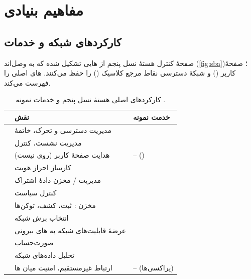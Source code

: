 \documentclass[11pt,a4paper]{article}
\begin{document}
\section{مفاهیم بنیادی}

\subsection{کارکردهای شبکه و خدمات}
صفحهٔ کنترل هستهٔ نسل پنجم از هایی تشکیل شده که به  وصل‌اند (\cref{fig:sba})؛ صفحهٔ کاربر () و
شبکهٔ دسترسی نقاط مرجع کلاسیک () را حفظ می‌کنند.  های اصلی را فهرست می‌کند.

\begin{table}[htbp]
\centering\small
\caption{کارکردهای اصلی هستهٔ نسل پنجم و خدمات نمونه \cite{ts23501}.}\label{tab:nfs}
\begin{tabularx}{\linewidth}{@{}l Y l@{}}
\toprule
{} & نقش & خدمت نمونه \\
\midrule
{}  & مدیریت دسترسی و تحرک، خاتمهٔ             &  \\
  & مدیریت نشست، کنترل                         &  \\
  & هدایت صفحهٔ کاربر (روی  نیست)              & -- () \\
 & کارساز احراز هویت                                    &  \\
 & مدیریت / مخزن دادهٔ اشتراک                         &  \\
  & کنترل سیاست                                          &  \\
  & مخزن : ثبت، کشف، توکن‌ها                    &  \\
 & انتخاب برش شبکه                                      &  \\
  & عرضهٔ قابلیت‌های شبکه به های بیرونی         &  \\
  & صورت‌حساب                                            &  \\
 & تحلیل داده‌های شبکه                                 &  \\
 & ارتباط غیرمستقیم، امنیت میان ها        & -- (پراکسی‌ها) \\
\bottomrule
\end{tabularx}
\end{table}
\end{document}
